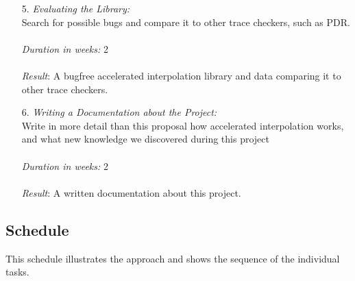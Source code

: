 \documentclass{article}
\begin{document}
\begin{itemize}
	\item[5.] \textsl{Evaluating the Library:} \\
	Search for possible bugs and compare it to other trace checkers, such as PDR. \\\\
	\textsl{Duration in weeks:} 2 \\\\
	\textsl{Result}: A bugfree accelerated interpolation library and data comparing it to other trace checkers.
	
	\item[6.] \textsl{Writing a Documentation about the Project:} \\
	Write in more detail than this proposal how accelerated interpolation works, and what new knowledge we discovered during this project \\\\
	\textsl{Duration in weeks:} 2 \\\\
	\textsl{Result}: A written documentation about this project.
\end{itemize}
\begin{landscape}
	\section{Schedule}
	This schedule illustrates the approach and shows the sequence of the individual tasks. \\ \\
	\hspace*{-4cm}
	
\end{landscape}
\pagebreak
{}



	
\end{document}
